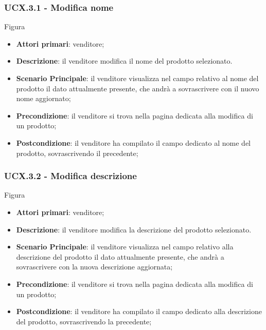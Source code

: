 \subsubsection{UCX.3.1 - Modifica nome}
Figura \\
\begin{itemize}
\item \textbf{Attori primari}: venditore;
\item \textbf{Descrizione}: il venditore modifica il nome del prodotto selezionato.
\item \textbf{Scenario Principale}: il venditore visualizza nel campo relativo al nome del prodotto il dato attualmente presente, che andrà a sovrascrivere con il nuovo nome aggiornato;
\item \textbf{Precondizione}: il venditore si trova nella pagina dedicata alla modifica di un prodotto;
\item \textbf{Postcondizione}: il venditore ha compilato il campo dedicato al nome del prodotto, sovrascrivendo il precedente;
\end{itemize}

\subsubsection{UCX.3.2 - Modifica descrizione}
Figura \\
\begin{itemize}
\item \textbf{Attori primari}: venditore;
\item \textbf{Descrizione}: il venditore modifica la descrizione del prodotto selezionato.
\item \textbf{Scenario Principale}: il venditore visualizza nel campo relativo alla descrizione del prodotto il dato attualmente presente, che andrà a sovrascrivere con la nuova descrizione aggiornata;
\item \textbf{Precondizione}: il venditore si trova nella pagina dedicata alla modifica di un prodotto;
\item \textbf{Postcondizione}: il venditore ha compilato il campo dedicato alla descrizione del prodotto, sovrascrivendo la precedente;
\end{itemize}

